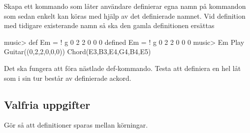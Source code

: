 {%



\Task Skapa ett kommando som låter användare definierar egna namn på kommandon som sedan enkelt kan köras med hjälp av det definierade namnet. Vid definition med tidigare existerande namn så ska den gamla definitionen ersättas
\begin{REPL}
music> def Em = ! g 0 2 2 0 0 0
defined Em = ! g 0 2 2 0 0 0
music> Em
Play Guitar((0,2,2,0,0,0)) Chord(E3,B3,E4,G4,B4,E5)
\end{REPL}
Det ska fungera att föra nästlade def-kommando. Testa att definiera en hel låt som i sin tur består av definierade ackord.

\Task 


\subsection{Valfria uppgifter}

\Task Gör så att definitioner sparas mellan körningar.

}
